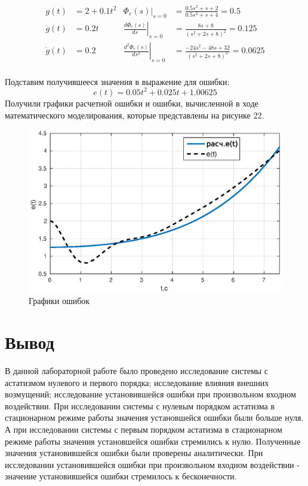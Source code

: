 \documentclass[12pt,a4paper]{article}
\begin{document}
\begin{align*}
    g(t) & = 2+0.1t^2 & \Phi_e(s)|_{s=0} & = \frac{0.5s^2+s+2}{0.5s^2+s+4}=0.5 \\
    \dot{g}(t) & = 0.2t & \left.\frac{d\Phi_e(s)}{ds}\right|_{s=0} & = \frac{8s+8}{(s^2+2s+8)^2}=0.125 \\
    \ddot{g}(t) & = 0.2 & \left.\frac{d^2\Phi_e(s)}{ds^2}\right|_{s=0} & = \frac{-24s^2-48s+32}{(s^2+2s+8)^3} = 0.0625 \\
\end{align*}\par

Подставим получившееся значения в выражение для ошибки:
\begin{equation}
e(t)=0.05t^2+0.025t+1.00625
\end{equation}
 Получили графики расчетной ошибки  и ошибки, вычисленной в ходе математического моделирования, которые представлены на рисунке 22.

\begin{figure}[H]
\centering
\includegraphics[width=\textwidth]{1/4_2e(t).eps}
\caption{Графики ошибок}
\end{figure}



\newpage

\section*{Вывод}

В данной лабораторной работе было проведено исследование системы с астатизмом нулевого и первого порядка; 
исследование влияния внешних возмущений; исследование установившейся ошибки при произвольном входном воздействии.
При исследовании системы с нулевым порядком астатизма в стационарном режиме работы значения установшейся ошибки были больше нуля.
А при исследовании системы с первым порядком астатизма в стационарном режиме работы значения установшейся ошибки стремились к нулю.
Полученные значения установившейся ошибки были проверены аналитически. 
При исследовании установившейся ошибки при произвольном входном воздействии - значение установившейся ошибки стремилось к бесконечности.
\end{document}
